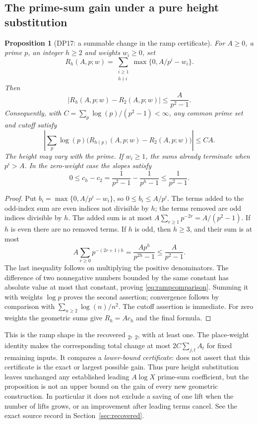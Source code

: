 \documentclass[11pt,a4paper]{article}
\newtheorem{proposition}[theorem]{Proposition}
\theoremstyle{definition}\newtheorem{remark}[theorem]{Remark}
\begin{document}
\subsection{The prime-sum gain under a pure height substitution}

\begin{proposition}[DP17: a summable change in the ramp certificate]\label{DP17}
For $A\ge0$, a prime $p$, an integer $h\ge2$ and weights $w_i\ge0$, set
\[
 R_h(A,p;w)=\sum_{\substack{i\ge1\\h\nmid i}}\max\{0,A/p^i-w_i\}.
\]
Then
\begin{equation}\label{eq:rampcomparison}
 |R_h(A,p;w)-R_2(A,p;w)|\le\frac{A}{p^2-1}.
\end{equation}
Consequently, with $C=\sum_p\log(p)/(p^2-1)<\infty$, any common prime set and cutoff satisfy
\[
 \left|\sum_p\log(p)\bigl(R_{h(p)}(A,p;w)-R_2(A,p;w)\bigr)\right|\le CA.
\]
The height may vary with the prime. If $w_i\ge1$, the sums already terminate when $p^i>A$. In the zero-weight case the slopes satisfy
\[
 0\le c_h-c_2=\frac1{p^2-1}-\frac1{p^h-1}\le\frac1{p^2-1}.
\]
\end{proposition}
\begin{proof}
Put $b_i=\max\{0,A/p^i-w_i\}$, so $0\le b_i\le A/p^i$. The terms added to the odd-index sum are even indices not divisible by $h$; the terms removed are odd indices divisible by $h$. The added sum is at most $A\sum_{r\ge1}p^{-2r}=A/(p^2-1)$. If $h$ is even there are no removed terms. If $h$ is odd, then $h\ge3$, and their sum is at most
\[
 A\sum_{r\ge0}p^{-(2r+1)h}=\frac{Ap^h}{p^{2h}-1}\le\frac{A}{p^2-1}.
\]
The last inequality follows on multiplying the positive denominators. The difference of two nonnegative numbers bounded by the same constant has absolute value at most that constant, proving \eqref{eq:rampcomparison}. Summing it with weights $\log p$ proves the second assertion; convergence follows by comparison with $\sum_{n\ge2}\log(n)/n^2$. The cutoff assertion is immediate. For zero weights the geometric sums give $R_h=Ac_h$ and the final formula.
\end{proof}

This is the ramp shape in the recovered \textsubscript{2}, \textsubscript{2}, with  at least one. The place-weight identity  makes the corresponding total change at most $2C\sum_{j,t}A_t$ for fixed remaining inputs. It compares a \emph{lower-bound certificate}:  does not assert that this certificate is the exact or largest possible gain. Thus pure height substitution leaves unchanged any established leading $A\log X$ prime-sum coefficient, but the proposition is not an upper bound on the gain of every new geometric construction. In particular it does not exclude a saving of one lift when the number of lifts grows, or an improvement after leading terms cancel. See the exact source record in Section~\ref{sec:recovered}.
\end{document}
